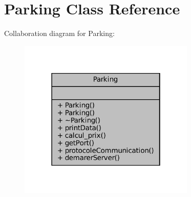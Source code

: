 \hypertarget{class_parking}{}\section{Parking Class Reference}
\label{class_parking}


Collaboration diagram for Parking\+:
\nopagebreak
\begin{figure}[H]
\begin{center}
\leavevmode
\includegraphics[width=238pt]{class_parking__coll__graph}
\end{center}
\end{figure}
